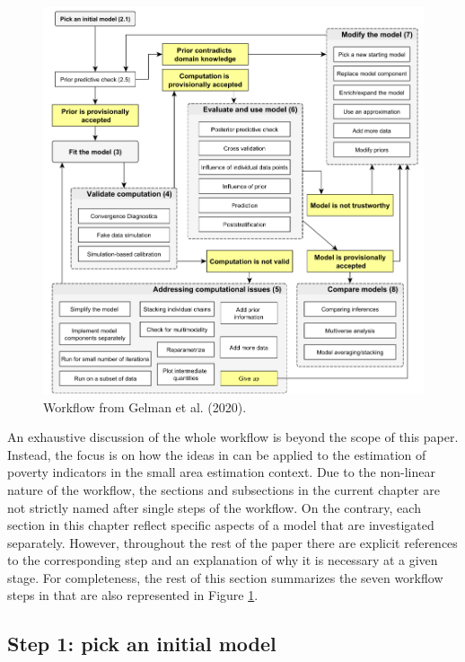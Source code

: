 \begin{figure}
    \includegraphics[width=16cm]{./graphics/workflow}
    \caption{Workflow from Gelman et al. (2020).}
    \label{fig:gelman_wf}
\end{figure}


An exhaustive discussion of the whole workflow is beyond the scope of this paper.
Instead, the focus is on how the ideas in \cite{gelman_bayesian_2020} can be applied to the estimation of poverty indicators in the small area estimation context.
Due to the non-linear nature of the workflow, the sections and subsections in the current chapter are not strictly named after single steps of the workflow.
On the contrary, each section in this chapter reflect specific aspects of a model that are investigated separately.
However, throughout the rest of the paper there are explicit references to the corresponding step and an explanation of why it is necessary at a given stage.
For completeness, the rest of this section summarizes the seven workflow steps in \cite{gelman_bayesian_2020} that are also represented in Figure \ref{fig:gelman_wf}.

\subsection{Step 1: pick an initial model}

